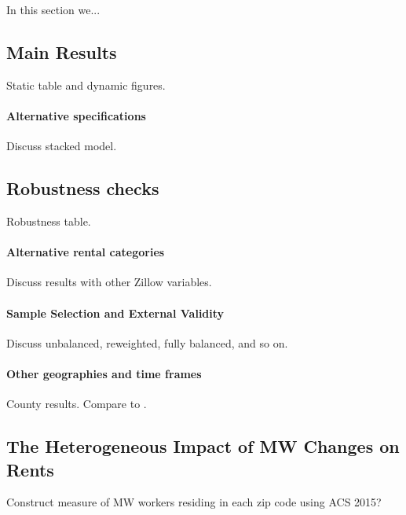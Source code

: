 
In this section we...

\subsection{Main Results}\label{sec:main_results}

Static table and dynamic figures.

\paragraph{Alternative specifications}

Discuss stacked model.

\subsection{Robustness checks}\label{sec:robustness_results}

Robustness table.

\paragraph{Alternative rental categories}

Discuss results with other Zillow variables.

\paragraph{Sample Selection and External Validity}

Discuss unbalanced, reweighted, fully balanced, and so on.

\paragraph{Other geographies and time frames}

County results.
Compare to \textcite{Yamagishi2019}.

\subsection{The Heterogeneous Impact of MW Changes on Rents}
\label{sec:heterogeneity_results}

Construct measure of MW workers residing in each zip code using ACS 2015?

